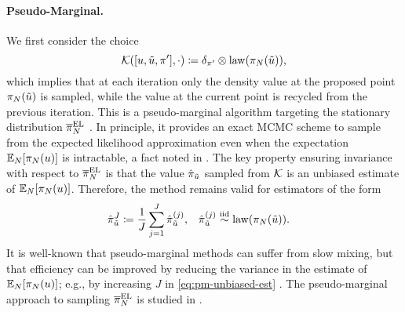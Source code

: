 \documentclass[12pt]{article}
\begin{document}
\paragraph{Pseudo-Marginal.}
We first consider the choice 
\begin{equation}
\postSampleKernel([\Par, \propPar, \postDens^\prime], \cdot)
\Def \delta_{\postDens^\prime} \otimes \mathrm{law}(\postEm[\Ndesign](\propPar)),
\end{equation}
which implies that at each iteration only the density value at the proposed point 
$\postEm[\Ndesign](\propPar)$  is sampled, while the value at the current point 
is recycled from the previous iteration. This is a pseudo-marginal algorithm 
targeting the stationary distribution $\postApproxNormMarg[\Ndesign]$ \citep{pseudoMarginalMCMC}.
In principle, it provides an exact MCMC scheme to sample from the expected likelihood 
approximation even when the expectation $\E_{\Ndesign}[\postEm[\Ndesign](\Par)]$ is intractable, 
a fact noted in \citet{StuartTeck1}. The key property ensuring invariance with respect to 
$\postApproxNormMarg[\Ndesign]$ is that the value $\hat{\postDens}_{\tilde{\Par}}$ sampled from 
$\postSampleKernel$ is an unbiased estimate of $\E_{\Ndesign}[\postEm[\Ndesign](\Par)]$.
Therefore, the method remains valid for estimators of the form 
\begin{align}
&\hat{\postDens}_{\tilde{\Par}}^{J} \Def \frac{1}{J} \sum_{j=1}^{J} \hat{\postDens}_{\tilde{\Par}}^{(j)},
&&\hat{\postDens}_{\tilde{\Par}}^{(j)} \overset{\mathrm{iid}}{\sim} \mathrm{law}(\postEm[\Ndesign](\propPar)). \label{eq:pm-unbiased-est}
\end{align}
It is well-known that pseudo-marginal methods
can suffer from slow mixing, but that efficiency can be improved by reducing the variance 
in the estimate of $\E_{\Ndesign}[\postEm[\Ndesign](\Par)]$; e.g., by increasing $J$ in
\cref{eq:pm-unbiased-est} \citep{pseudoMarginalMCMC,pseudoMarginalEfficiency}.
The pseudo-marginal approach to sampling $\postApproxNormMarg[\Ndesign]$ is studied 
in \citet{garegnani2021NoisyMCMC}.
\end{document}
